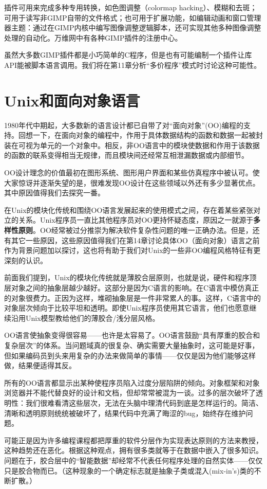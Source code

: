 \documentclass[12pt,oneside]{book}
\begin{document}
插件可用来完成多种专用转换，如色图调整（colormap hacking）、模糊和去斑；可用于读写非GIMP自带的文件格式；也可用于扩展功能，如编辑动画和窗口管理器主题：通过在GIMP内核中编写图像调整逻辑脚本，还可实现其他多种图像调整处理的自动化。万维网中有各种GIMP插件的注册中心。

虽然大多数GIMP插件都是小巧简单的C程序，但是也有可能编制一个插件让库API能被脚本语言调用。我们将在第11章分析“多价程序”模式时讨论这种可能性。


\section{Unix和面向对象语言}
1980年代中期起，大多数新的语言设计都已自带了对“面向对象”(OO)编程的支持。回想一下，在面向对象的编程中，作用于具体数据结构的函数和数据一起被封装在可视为单元的一个对象中。相反，非OO语言中的模块使数据和作用于该数据的函数的联系变得相当无规律，而且模块间还经常互相泄漏数据或内部细节。

OO设计理念的价值最初在图形系统、图形用户界面和某些仿真程序中被认可。使大家惊讶并逐渐失望的是，很难发现OO设计在这些领域以外还有多少显著优点。其中原因值得我们去探究一番。

在Unix的模块化传统和围绕OO语言发展起来的使用模式之间，存在着某些紧张对立的关系。Unix程序员一直比其他程序员对OO更持怀疑态度，原因之一就源于\textbf{多样性原则}。OO经常被过分推崇为解决软件复杂性问题的唯一正确办法。但是，还有其它一些原因，这些原因值得我们在第14章讨论具体OO（面向对象）语言之前作为背景问题加以探讨，这也将有助于我们对Unix的一些非OO编程风格特征有更深刻的认识。

前面我们提到，Unix的模块化传统就是薄胶合层原则，也就是说，硬件和程序顶层对象之间的抽象层越少越好。这部分是因为C语言的影响。在C语言中模仿真正的对象很费力。正因为这样，堆砌抽象层是一件非常累人的事。这样，C语言中的对象层次倾向于比较平坦和透明。即使Unix程序员使用其它语言，他们也愿意继续沿用Unix模型教给他们的薄胶合/浅分层风格。

OO语言使抽象变得很容易——也许是太容易了。OO语言鼓励“具有厚重的胶合和复杂层次”的体系。当问题域真的很复杂、确实需要大量抽象时，这可能是好事，但如果编码员到头来用复杂的办法来做简单的事情——仅仅是因为他们能够这样做，结果便适得其反。

所有的OO语言都显示出某种使程序员陷入过度分层陷阱的倾向。对象框架和对象浏览器并不能代替良好的设计和文档，但却常常被混为一谈。过多的层次破坏了透明性：我们很难看清这些层次，无法在头脑中理清代码到底是怎样运行的。简洁、清晰和透明原则统统被破坏了，结果代码中充满了晦涩的bug，始终存在维护问题。

可能正是因为许多编程课程都把厚重的软件分层作为实现表达原则的方法来教授，这种趋势还在恶化。根据这种观点，拥有很多类就等于在数据中嵌入了很多知识。问题在于，胶合层中的“智能数据”却经常不代表任何程序处理的自然实体——仅仅只是胶合物而已。（这种现象的一个确定标志就是抽象子类或混入(mix-in's)类的不断扩散。）
\end{document}
